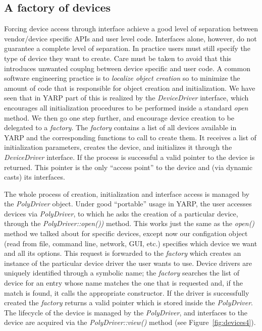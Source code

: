 \subsection{A factory of devices}
Forcing device access through 
interface achieve a good level of separation between vendor/device 
specific APIs and user level code. Interfaces alone, however, do not 
guarantee a complete level of separation. In practice users must still 
specify the type of device they want to create. Care must be taken to 
avoid that this introduces unwanted couplng between device specific and 
user code. A common software 
engineering practice is to \emph{localize object creation} so to 
minimize the amount of code that is responsible for object creation 
and initialization. 
We have seen that in YARP part of this is realized by the 
\emph{DeviceDriver} interface, which encourages all initialization procedures 
to be performed inside a standard \emph{open} method. 
We then go one step further, and encourage device creation to be
delegated to a \emph{factory}. The \emph{factory} contains a list of 
all devices available in YARP and the corresponding functions to call 
to create them. It receives a list of initialization parameters, 
creates the device, and initializes it 
through the \emph{DeviceDriver} interface. If the process is successful
a valid pointer to the device is returned. This pointer is the only 
``access point'' to the device and (via dynamic casts) its interfaces.
%
%


The whole process of creation, initialization and interface access is 
managed by the \emph{PolyDriver} object. 
Under good ``portable'' usage in YARP, the user accesses devices
via \emph{PolyDriver}, to which he asks the creation of a particular 
device, through the \emph{PolyDriver::open())} method. 
%
This works just the same as the \emph{open()} method we
talked about for specific devices, except now our configation
object (read from file, command line, network, GUI, etc.)
specifies which device we want and all its options.
%
This request is 
forwarded to the \emph{factory} which creates an instance of the particular 
device driver the user wants to use. Device drivers are uniquely identified 
through a symbolic name; the \emph{factory} searches the list of device 
for an entry whose name matches the one that is requested and, if the match 
is found, it calls the appropriate constructor. If the driver is successfully 
created the \emph{factory} returns a valid pointer which is stored inside 
the \emph{PolyDriver}. The lifecycle of the device is managed by the 
\emph{PolyDriver}, and interfaces to the device are acquired via 
the  \emph{PolyDriver::view()} method (see Figure~\ref{fig:devices4}).


